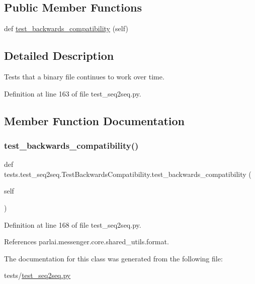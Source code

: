 \subsection*{Public Member Functions}
\begin{DoxyCompactItemize}
\item 
def \hyperlink{classtests_1_1test__seq2seq_1_1TestBackwardsCompatibility_a16dafded5f7a24b334e692873a74b74b}{test\+\_\+backwards\+\_\+compatibility} (self)
\end{DoxyCompactItemize}


\subsection{Detailed Description}
\begin{DoxyVerb}Tests that a binary file continues to work over time.
\end{DoxyVerb}
 

Definition at line 163 of file test\+\_\+seq2seq.\+py.



\subsection{Member Function Documentation}
\mbox{\label{classtests_1_1test__seq2seq_1_1TestBackwardsCompatibility_a16dafded5f7a24b334e692873a74b74b}} 
\subsubsection{\texorpdfstring{test\+\_\+backwards\+\_\+compatibility()}{test\_backwards\_compatibility()}}
{\footnotesize\ttfamily def tests.\+test\+\_\+seq2seq.\+Test\+Backwards\+Compatibility.\+test\+\_\+backwards\+\_\+compatibility (\begin{DoxyParamCaption}\item[{}]{self }\end{DoxyParamCaption})}



Definition at line 168 of file test\+\_\+seq2seq.\+py.



References parlai.\+messenger.\+core.\+shared\+\_\+utils.\+format.



The documentation for this class was generated from the following file\+:\begin{DoxyCompactItemize}
\item 
tests/\hyperlink{test__seq2seq_8py}{test\+\_\+seq2seq.\+py}\end{DoxyCompactItemize}
